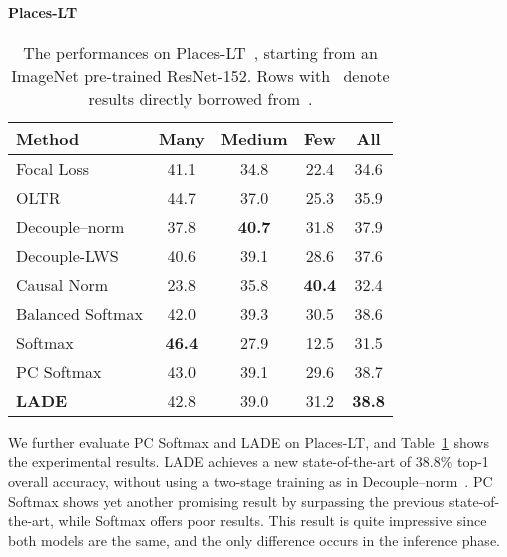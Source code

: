\documentclass[final]{cvpr}
\begin{document}
\paragraph{Places-LT}
\begin{table}
\footnotesize
\centering
\caption{The performances on Places-LT~\cite{liu2019large}, starting from an ImageNet pre-trained ResNet-152. Rows with ~denote results directly borrowed from~\cite{kang2019decoupling}.}
\label{tab:place_main}
\vspace{0pt}
\begin{tabular}{l|ccc|c}
\toprule
Method & Many & Medium & Few & \textbf{All} \\
\midrule
Focal Loss & 41.1 & 34.8 & 22.4 & 34.6 \\
OLTR & 44.7 & 37.0 & 25.3 & 35.9 \\
Decouple--norm & 37.8 & \textbf{40.7} & 31.8 & 37.9 \\
Decouple-LWS & 40.6 &	39.1 &	28.6 & 37.6 \\
Causal Norm & 23.8 & 35.8 & \textbf{40.4} & 32.4 \\
Balanced Softmax & 42.0	& 39.3	& 30.5 & 38.6 \\
Softmax & \textbf{46.4} & 27.9 & 12.5 & 31.5 \\\midrule
PC Softmax & 43.0 & 39.1 & 29.6 & 38.7 \\
\textbf{LADE} & 42.8 & 39.0 & 31.2 & \textbf{38.8} \\
\bottomrule
\end{tabular}
\end{table} We further evaluate PC Softmax and LADE on Places-LT, and Table~\ref{tab:place_main} shows the experimental results.
LADE achieves a new state-of-the-art of 38.8\% top-1 overall accuracy, without using a two-stage training as in Decouple--norm~\cite{kang2019decoupling}.
PC Softmax shows yet another promising result by surpassing the previous state-of-the-art, while Softmax offers poor results.
This result is quite impressive since both models are the same, and the only difference occurs in the inference phase.
\end{document}
